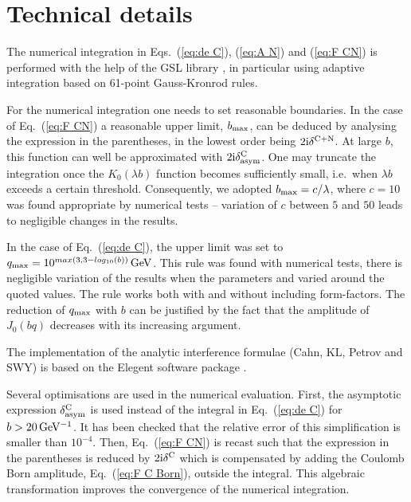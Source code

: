 \documentclass{appolb}
\def\un#1{\,{\rm #1}}
\def\I{{\rm i}}
\begin{document}

\section{Technical details}
\label{sec:technical}

The numerical integration in Eqs.~(\ref{eq:de C}), (\ref{eq:A N}) and (\ref{eq:F CN}) is performed with the help of the GSL library \cite{gsl}, in particular using adaptive integration based on 61-point Gauss-Kronrod rules.

For the numerical integration one needs to set reasonable boundaries. In the case of Eq.~(\ref{eq:F CN}) a reasonable upper limit, $b_{\rm max}$, can be deduced by analysing the expression in the parentheses, in the lowest order being $2\I\delta^{\rm C+N}$. At large $b$, this function can well be approximated with $2\I\delta^{\rm C}_{\rm asym}$. One may truncate the integration once the $K_0(\lambda b)$ function becomes sufficiently small, i.e.~when $\lambda b$ exceeds a certain threshold. Consequently, we adopted $b_{\rm max} = c / \lambda$, where $c = 10$ was found appropriate by numerical tests -- variation of $c$ between $5$ and $50$ leads to negligible changes in the results.

In the case of Eq.~(\ref{eq:de C}), the upper limit was set to $q_{\rm max} = 10^{max(3, 3 - log_{10}(b))} \un{GeV}$. This rule was found with numerical tests, there is negligible variation of the results when the parameters and varied around the quoted values. The rule works both with and without including form-factors. The reduction of $q_{\rm max}$ with $b$ can be justified by the fact that the amplitude of $J_0(bq)$ decreases with its increasing argument.

The implementation of the analytic interference formulae (Cahn, KL, Petrov and SWY) is based on the Elegent software package \cite{elegent}.

Several optimisations are used in the numerical evaluation. First, the asymptotic expression $\delta^{\rm C}_{\rm asym}$ is used instead of the integral in Eq.~(\ref{eq:de C}) for $b > 20\un{GeV^{-1}}$. It has been checked that the relative error of this simplification is smaller than $10^{-4}$. Then, Eq.~(\ref{eq:F CN}) is recast such that the expression in the parentheses is reduced by $2\I\delta^{\rm C}$ which is compensated by adding the Coulomb Born amplitude, Eq.~(\ref{eq:F C Born}), outside the integral. This algebraic transformation improves the convergence of the numerical integration.
\end{document}

